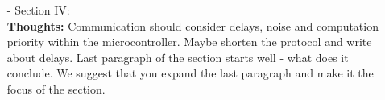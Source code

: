 \begin{itemize}
	\item[-] Section IV: \\
           \textbf{Thoughts:} Communication should consider delays, noise and computation priority within the microcontroller. Maybe shorten the protocol and write about delays. Last paragraph of the section starts well - what does it conclude. We suggest that you expand the last paragraph and make it the focus of the section. 
\end{itemize}
